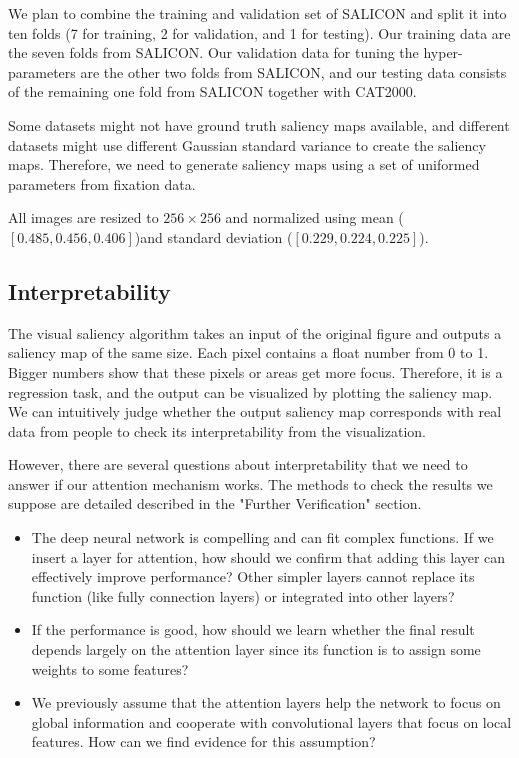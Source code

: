 \documentclass[12pt]{article}
\begin{document}
We plan to combine the training and validation set of SALICON
and split it into ten folds (7 for training, 2 for validation, and 1 for testing).
Our training data are the seven folds from SALICON.
Our validation data for tuning the hyper-parameters are the other two folds from SALICON,
and our testing data consists of the remaining one fold from SALICON together with CAT2000.

Some datasets might not have ground truth saliency maps available, and different datasets might use different Gaussian standard variance to create the saliency maps.
Therefore, we need to generate saliency maps using a set of uniformed parameters from fixation data.

All images are resized to $256 \times 256$ and normalized using mean ($[0.485, 0.456, 0.406]$)and standard deviation ($[0.229, 0.224, 0.225]$).



\subsection{Interpretability}

The visual saliency algorithm takes an input of the original figure and outputs a saliency map of the same size. Each pixel contains a float number from 0 to 1. Bigger numbers show that these pixels or areas get more focus. Therefore, it is a regression task, and the output can be visualized by plotting the saliency map. We can intuitively judge whether the output saliency map corresponds with real data from people to check its interpretability from the visualization.

However, there are several questions about interpretability that we need to answer if our attention mechanism works. The methods to check the results we suppose are detailed described in the "Further Verification" section.

\begin{itemize}
    \item The deep neural network is compelling and can fit complex functions. If we insert a layer for attention, how should we confirm that adding this layer can effectively improve performance? Other simpler layers cannot replace its function (like fully connection layers) or integrated into other layers?
    \item If the performance is good, how should we learn whether the final result depends largely on the attention layer since its function is to assign some weights to some features?
    \item We previously assume that the attention layers help the network to focus on global information and cooperate with convolutional layers that focus on local features. How can we find evidence for this assumption?
\end{itemize}
\end{document}
